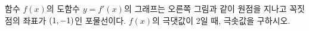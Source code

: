 \noindent\begin{minipage}[t]{0.58\linewidth}\vspace{0pt}\raggedright 함수 $f(x)$의 도함수 $y=f'(x)$의 그래프는 오른쪽 그림과 같이 원점을 지나고 꼭짓점의 좌표가 $(1{,}\mkern3mu\mathopen{}-1)$인 포물선이다. $f(x)$의 극댓값이 2일 때, 극솟값을 구하시오.\end{minipage}\hfill\begin{minipage}[t]{0.4\linewidth}\vspace{0pt}\centering \resizebox{\ifdim\width>\linewidth\linewidth\else\width\fi}{!}{}\end{minipage}\par
